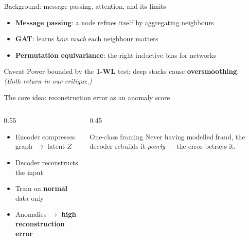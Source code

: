 \documentclass[10pt,aspectratio=169]{beamer}
\newcommand{\gr}[1]{\textcolor{mGreen}{\textbf{#1}}}   %
\newcommand{\rd}[1]{\textcolor{mRed}{\textbf{#1}}}     %
\newenvironment{caveat}{\begin{alertblock}{Caveat}}{\end{alertblock}}
\begin{document}
\begin{frame}{Background: message passing, attention, and its limits}
  \begin{itemize}
    \item \textbf{Message passing}: a node refines itself by aggregating neighbours
    \item \textbf{GAT}: learns \emph{how much} each neighbour matters
    \item \textbf{Permutation equivariance}: the right inductive bias for networks
  \end{itemize}
  \vspace{0.3em}
  \begin{caveat}
    Power bounded by the \rd{1-WL} test; deep stacks cause \rd{oversmoothing}.
    \textit{(Both return in our critique.)}
  \end{caveat}
\end{frame}

\begin{frame}{The core idea: reconstruction error as an anomaly score}
  \begin{columns}[T]
    \begin{column}{0.55\textwidth}
      \begin{itemize}
        \item Encoder compresses graph $\rightarrow$ latent $Z$
        \item Decoder reconstructs the input
        \item Train on \gr{normal} data only
        \item Anomalies $\rightarrow$ \rd{high reconstruction error}
      \end{itemize}
    \end{column}
    \begin{column}{0.45\textwidth}
      \begin{block}{One-class framing}
        Never having modelled fraud, the decoder rebuilds it \emph{poorly} --- the error betrays it.
      \end{block}
    \end{column}
  \end{columns}
\end{frame}

\end{document}
